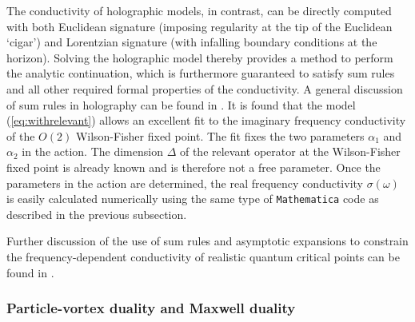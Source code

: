 \documentclass[10pt, oneside]{book}
\let\a=\alpha \let\b=\beta \let\g=\gamma \let\d=\delta \let\e=\varepsilon
\begin{document}
\begin{doublespace}
The conductivity of holographic models, in contrast, can be directly computed with both Euclidean signature (imposing regularity at the tip of the Euclidean `cigar') and Lorentzian signature (with infalling boundary conditions at the horizon). Solving the holographic model thereby provides a method to perform the analytic continuation, which is furthermore guaranteed to satisfy sum rules and all other required formal properties of the conductivity. A general discussion of sum rules in holography can be found in \cite{Gulotta:2010cu}.
It is found that the model (\ref{eq:withrelevant}) allows an excellent fit to the imaginary frequency conductivity of the $O(2)$ Wilson-Fisher fixed point. The fit fixes the two parameters $\a_1$ and $\a_2$ in the action. The dimension $\Delta$ of the relevant operator at the Wilson-Fisher fixed point is already known and is therefore not a free parameter. Once the parameters in the action are determined, the real frequency conductivity $\sigma(\omega)$ is easily calculated numerically using the same type of \texttt{Mathematica} code as described in the previous subsection.

Further discussion of the use of sum rules and asymptotic expansions to constrain the frequency-dependent conductivity of realistic quantum critical points can be found in \cite{Witczak-Krempa:2015pia}.

\subsubsection{Particle-vortex duality and Maxwell duality}
\label{sec:selfdual}


\end{doublespace}
\end{document}

